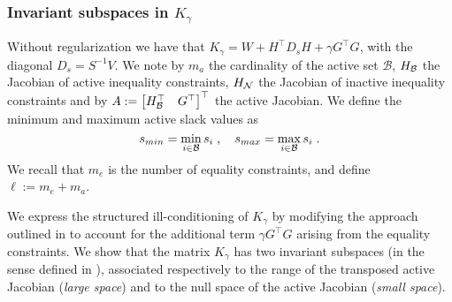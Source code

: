 \subsubsection{Invariant subspaces in $K_\gamma$}
Without regularization we have that $K_\gamma = W + H^\top D_s H + \gamma G^\top G$, with
the diagonal $D_s = S^{-1} V$.
We note by $m_a$ the cardinality of the active set $\mathcal{B}$,
$H_{\mathcal{B}}$ the Jacobian of active inequality constraints, $H_{\mathcal{N}}$ the
Jacobian of inactive inequality constraints and by
$A := \begin{bmatrix} H_{\mathcal{B}}^\top & G^\top \end{bmatrix}^\top$ the active Jacobian.
We define the minimum and maximum active slack values as
\begin{equation}
  s_{min} = \min_{i \in \mathcal{B}} s_i \; , \quad
  s_{max} = \max_{i \in \mathcal{B}} s_i \; .
\end{equation}
We recall that $m_e$ is the number of equality constraints,
and define $\ell := m_e + m_a$.

We express the structured ill-conditioning of $K_\gamma$ by
modifying the approach outlined in \cite[Theorem 3.2]{wright1998ill} to account for the additional
term $\gamma G^\top G$ arising from the equality constraints.
We show that the matrix $K_\gamma$ has two invariant subspaces
(in the sense defined in \cite[Chapter 5]{stewart1990matrix}),
associated respectively to the range of the transposed active Jacobian
(\emph{large space}) and to the null space of the active Jacobian (\emph{small space}).

